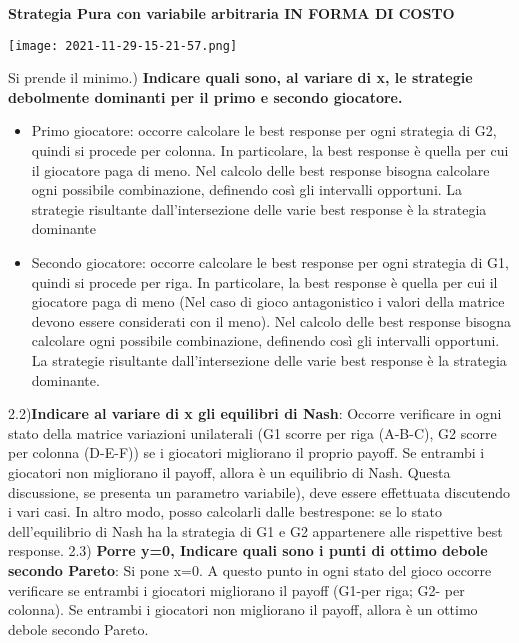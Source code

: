 \documentclass{article}
\theoremstyle{definition}
\theoremstyle{remark}
\begin{document}
\textbf{Strategia Pura con variabile arbitraria IN FORMA DI COSTO}
\begin{center}
    \texttt{[image: 2021-11-29-15-21-57.png]}
\end{center}
Si prende il minimo.) \textbf{Indicare quali sono, al variare di x, le strategie debolmente dominanti per il primo e secondo giocatore.}\newline
\begin{itemize}
    \item Primo giocatore: occorre calcolare le best response per ogni strategia di G2, quindi si procede per colonna. In particolare, la best response è quella per cui il giocatore paga di meno.\newline
          Nel calcolo delle best response bisogna calcolare ogni possibile combinazione, definendo così gli intervalli opportuni. La strategie risultante dall'intersezione delle varie best response è la strategia dominante
    \item Secondo giocatore: occorre calcolare le best response per ogni strategia di G1, quindi si procede per riga. In particolare, la best response è quella per cui il giocatore paga di meno (Nel caso di gioco antagonistico i valori della matrice devono essere considerati con il meno).\newline
          Nel calcolo delle best response bisogna calcolare ogni possibile combinazione, definendo così gli intervalli opportuni. La strategie risultante dall'intersezione delle varie best response è la strategia dominante.
\end{itemize}
2.2)\textbf{Indicare al variare di x gli equilibri di Nash}: Occorre verificare in ogni stato della matrice variazioni unilaterali (G1 scorre per riga (A-B-C), G2 scorre per colonna (D-E-F)) se i giocatori migliorano il proprio payoff. Se entrambi i giocatori non migliorano il payoff, allora è un equilibrio di Nash.\newline
Questa discussione, se presenta un parametro variabile), deve essere effettuata discutendo i vari casi.\newline
In altro modo, posso calcolarli dalle bestrespone: se lo stato dell'equilibrio di Nash ha la strategia di G1 e G2 appartenere alle rispettive best response.
2.3) \textbf{Porre y=0, Indicare quali sono i punti di ottimo debole secondo Pareto}: Si pone x=0. A questo punto in ogni stato del gioco occorre verificare se entrambi i giocatori migliorano il payoff (G1-per riga; G2- per colonna). Se entrambi i giocatori non migliorano il payoff, allora è un ottimo debole secondo Pareto.\newline
\end{document}
